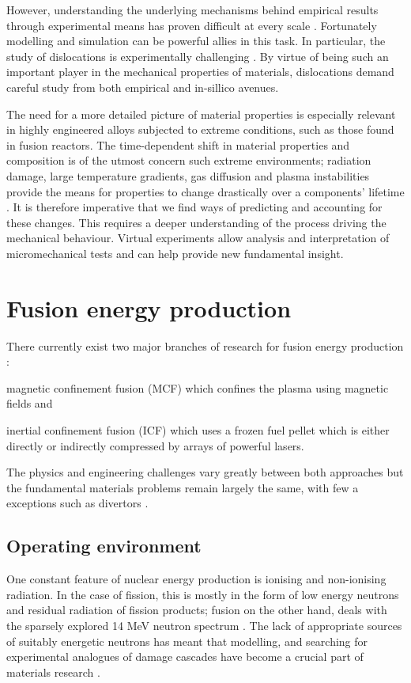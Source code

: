 However, understanding the underlying mechanisms behind empirical results through experimental means has proven difficult at every scale \cite{multiscale_model_mats1, multiscale_model_mats2}. Fortunately modelling and simulation can be powerful allies in this task. In particular, the study of dislocations is experimentally challenging \cite{dln_exp_obs1, dln_exp_obs2, dln_exp_obs3}. By virtue of being such an important player in the mechanical properties of materials, dislocations demand careful study from both empirical and in-sillico avenues.

The need for a more detailed picture of material properties is especially relevant in highly engineered alloys subjected to extreme conditions, such as those found in fusion reactors. The time-dependent shift in material properties and composition is of the utmost concern such extreme environments; radiation damage, large temperature gradients, gas diffusion and plasma instabilities provide the means for properties to change drastically over a components' lifetime \cite{fusmat1, mats_fusion1, mats_fusion2}. It is therefore imperative that we find ways of predicting and accounting for these changes. This requires a deeper understanding of the process driving the mechanical behaviour. Virtual experiments allow analysis and interpretation of micromechanical tests and can help provide new fundamental insight.

\section{Fusion energy production}
\label{s:fusion}
There currently exist two major branches of research for fusion energy production \cite{icfvsmcf}:
\begin{inparaenum}
    \item magnetic confinement fusion (MCF) \cite{mcf} which confines the plasma using magnetic fields and
    \item inertial confinement fusion (ICF) \cite{icf} which uses a frozen fuel pellet which is either directly or indirectly compressed by arrays of powerful lasers.
\end{inparaenum}
The physics and engineering challenges vary greatly between both approaches but the fundamental materials problems remain largely the same, with few a exceptions such as divertors \cite{icf_mcf1, icf_mcf2}.

\subsection{Operating environment}
\label{ss:operating_env}
One constant feature of nuclear energy production is ionising and non-ionising radiation. In the case of fission, this is mostly in the form of low energy neutrons and residual radiation of fission products; fusion on the other hand, deals with the sparsely explored 14 MeV neutron spectrum \cite{mats_fis_fus}. The lack of appropriate sources of suitably energetic neutrons \cite{ifmif} has meant that modelling, and searching for experimental analogues of damage cascades have become a crucial part of materials research \cite{fusmat1s}.

